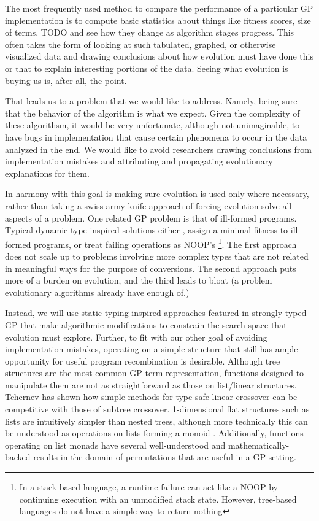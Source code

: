 \documentclass{acm_proc_article-sp}
\begin{document}
The most frequently used method to compare the performance of a
particular GP implementation is to compute basic statistics about
things like fitness scores, size of terms, TODO and see how they
change as algorithm stages progress. This often takes the form of
looking at such tabulated, graphed, or otherwise visualized data and
drawing conclusions about how evolution must have done this or that to
explain interesting portions of the data. Seeing what evolution is
buying us is, after all, the point.

That leads us to a problem that we would like to address. Namely,
being sure that the behavior of the algorithm is what we expect. Given
the complexity of these algorithsm, it would be very unfortunate,
although not unimaginable, to have bugs in implementation that cause
certain phenomena to occur in the data analyzed in the end. We would
like to avoid researchers drawing conclusions from implementation
mistakes and attributing and propagating evolutionary explanations for
them.

In harmony with this goal is making sure evolution is used only where
necessary, rather than taking a swiss army knife approach of forcing
evolution solve all aspects of a problem. One
related GP problem is that of ill-formed programs. Typical
dynamic-type inspired solutions either \cite{koza:92}, assign a minimal fitness to
ill-formed programs, or treat failing operations as
NOOP's
\footnote{In a stack-based language, a runtime failure can act like a
  NOOP by continuing execution with an unmodified stack state. However,
  tree-based languages do not have a simple way to return nothing}.
The first approach does not scale up to problems involving more
complex types that are not related in meaningful ways for the purpose
of conversions. The second approach puts more of a burden on evolution, and the third
leads to bloat (a problem evolutionary algorithms already have enough
of.)

Instead, we will use static-typing inspired approaches featured in
strongly typed GP \cite{montana:strongtree, tchernev:forthcross} that make algorithmic
modifications to constrain the search space that evolution must
explore. Further, to fit with our other goal of avoiding
implementation mistakes, operating on a simple structure that still
has ample opportunity for useful program recombination is
desirable. Although tree structures are the most common GP term
representation, functions designed to manipulate them are not as
straightforward as those on list/linear structures. Tchernev
\cite{tchernev:forthcross, tchernev:crossmethods} has shown how simple
methods for type-safe linear crossover can be competitive with those
of subtree crossover. 1-dimensional flat structures such as lists are
intuitively simpler than nested trees, although more technically this
can be understood as operations on lists forming a monoid
\cite{spivey:catlists}. Additionally, functions operating on list monads have
several well-understood and mathematically-backed results in the
domain of permutations that are useful in a GP setting.
\end{document}
